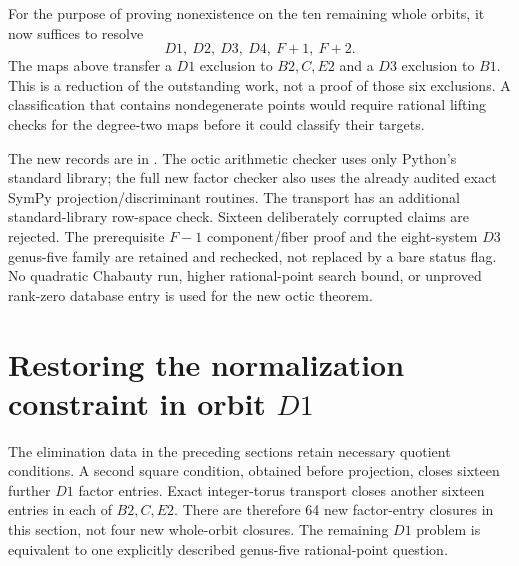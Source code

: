 \documentclass[11pt,letterpaper]{article}
\theoremstyle{definition}\newtheorem{definition}[theorem]{Definition}
\theoremstyle{remark}\newtheorem{remark}[theorem]{Remark}
\begin{document}
For the purpose of proving nonexistence on the ten remaining whole orbits, it now suffices to resolve
\[
 \boxed{D1,\ D2,\ D3,\ D4,\ F{+}1,\ F{+}2.}
\]
The maps above transfer a $D1$ exclusion to $B2,C,E2$ and a $D3$ exclusion to $B1$. This is a reduction of the outstanding work, not a proof of those six exclusions. A classification that contains nondegenerate points would require rational lifting checks for the degree-two maps before it could classify their targets.

The new records are in . The octic arithmetic checker uses only Python's standard library; the full new factor checker also uses the already audited exact SymPy projection/discriminant routines. The transport has an additional standard-library row-space check. Sixteen deliberately corrupted claims are rejected. The prerequisite $F{-}1$ component/fiber proof and the eight-system $D3$ genus-five family are retained and rechecked, not replaced by a bare status flag. No quadratic Chabauty run, higher rational-point search bound, or unproved rank-zero database entry is used for the new octic theorem.

\section{Restoring the normalization constraint in orbit $D1$}\label{sec:d1norm}
The elimination data in the preceding sections retain necessary quotient conditions. A second square condition, obtained before projection, closes sixteen further $D1$ factor entries. Exact integer-torus transport closes another sixteen entries in each of $B2,C,E2$. There are therefore 64 new factor-entry closures in this section, not four new whole-orbit closures. The remaining $D1$ problem is equivalent to one explicitly described genus-five rational-point question.
\end{document}
